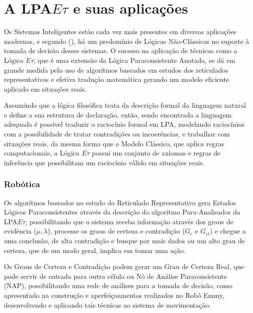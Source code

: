 \section{A LPA$E\tau$ e suas aplicações}

Os Sistemas Inteligentes estão cada vez mais presentes em diversas aplicações modernas, e segundo \citeauthor{JISF2011}(\citeyear{JISF2011}), há um predomínio de Lógicas Não-Clássicas no suporte à tomada de decisão desses sistemas. O sucesso na aplicação de técnicas como a Lógica $E\tau$, que é uma extensão da Lógica Paraconsistente Anotada, se dá em grande medida pelo uso de algorítmos baseados em estudos dos reticulados representativos e efetiva tradução matemática gerando um modelo eficiente aplicado em situações reais.

Assumindo que a lógica filosófica trata da descrição formal da linguagem natural e define a sua estrutura de declaração, então, sendo encontrada a linguagem adequada é possível traduzir o raciocínio formal em LPA, modelando raciocínios com a possibilidade de tratar contradições ou incoerências, e trabalhar com situações reais, da mesma forma que o Modelo Clássico, que aplica regras computacionais, a Lógica $E\tau$ possui um conjunto de axiomas e regras de inferência que possibilitam um raciocínio válido em situações reais.


\subsubsection{Robótica}

Os algorítmos baseados no estudo do Reticulado Representativo gera Estados Lógicos Paraconsistentes através da descrição do algorítmo Para-Analisador da LPA$E\tau$, possibilitando que o sistema receba informação através dos graus de evidência ($\mu, \lambda$), processe os graus de certeza e contradição ($G_c$ e $G_{ct}$) e chegue a uma conclusão, de alta contradição e busque por mais dados ou um alto grau de certeza, que de um modo geral, implica em tomar uma ação. 

Os Graus de Certeza e Contradição podem gerar um Grau de Certeza Real, que pode servir de entrada para outra célula ou Nó de Análise Paraconsistente (NAP), possibilitando uma rede de análises para a tomada de decisão, como apresentado na construção e aperfeiçoamentos realizados no Robô Emmy, \cite{JoaoInacio}\cite{ClaudioRodrigoTorres} desenvolvendo e aplicando tais técnicas ao sistema de movimentação.


